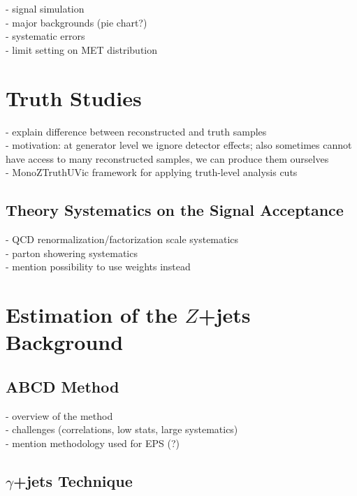 - signal simulation\\
- major backgrounds (pie chart?)\\
- systematic errors\\
- limit setting on MET distribution\\

\section{Truth Studies} 

- explain difference between reconstructed and truth samples\\
- motivation: at generator level we ignore detector effects; also sometimes cannot have access to many reconstructed samples, we can produce them ourselves\\
- MonoZTruthUVic framework for applying truth-level analysis cuts\\

\subsection{Theory Systematics on the Signal Acceptance}
- QCD renormalization/factorization scale systematics\\
- parton showering systematics\\
- mention possibility to use weights instead\\

\section{Estimation of the $Z$+jets Background}

\subsection{ABCD Method}

- overview of the method\\
- challenges (correlations, low stats, large systematics)\\
- mention methodology used for EPS (?)\\

\subsection{$\gamma$+jets Technique}

